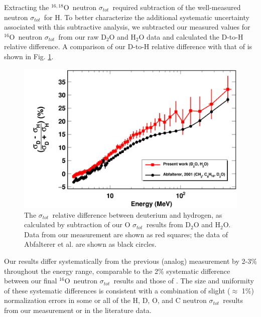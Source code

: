 \documentclass[twocolumn,secnumarabic,amssymb, nobibnotes, aps, prl,
superscriptaddress, nobalancelastpage, draft]{revtex4}
\newcommand{\tot}{\ensuremath{\sigma_{tot}}}
\newcommand{\oSix}{\ensuremath{^{16}}O}
\newcommand{\oSixEight}{\ensuremath{^{16,18}}O}
\begin{document}
Extracting the \oSixEight\ neutron \tot\ required subtraction of the
well-measured neutron \tot\ for H. To better characterize
the additional systematic uncertainty
associated with this subtractive analysis, we subtracted our measured
values for \oSix\ neutron \tot\ from our raw D$_{2}$O and H$_{2}$O data and 
calculated the D-to-H relative difference. A
comparison of our D-to-H relative difference with that of
\cite{Abfalterer1998} is shown in Fig. \ref{DtoH}.
\begin{figure}[tb]
    \centering
    \includegraphics[width=\linewidth]{figures/relativeDiff_DtoH.png}
    \caption[\tot\ relative difference between deuterium and hydrogen from our measurement]
    {The \tot\ relative difference between deuterium and hydrogen,
        as calculated by subtraction of our O \tot\ results from
        D$_{2}$O and H$_{2}$O. Data from our measurement are shown as red
        squares; the data of Abfalterer et al. \cite{Abfalterer1998} are shown
    as black circles.}
    \label{DtoH}
\end{figure}
Our results differ systematically from the previous (analog) measurement by 2-3\% throughout the
energy range, comparable to the 2\% systematic difference between our final
\oSix\ neutron \tot\ results and those of \cite{Abfalterer2001}. The size and
uniformity of these systematic differences is consistent with
a combination of slight ($\approx$ 1\%) normalization errors
in some or all of the H, D, O, and C neutron \tot\ results
from our measurement or in the literature data.
\end{document}
